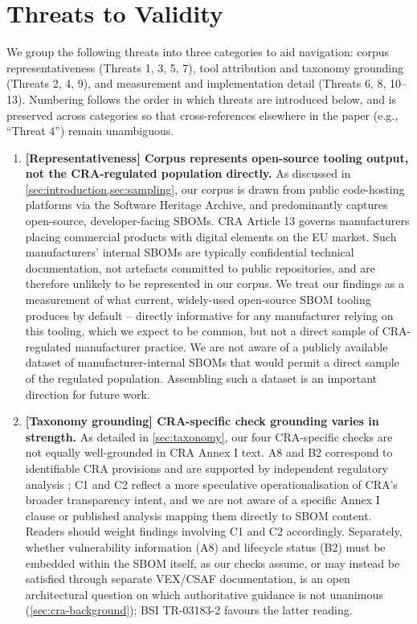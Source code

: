 \documentclass[11pt]{article}
\begin{document}
\section{Threats to Validity}
\label{sec:threats}

We group the following threats into three categories to aid navigation: corpus representativeness (Threats 1, 3, 5, 7), tool attribution and taxonomy grounding (Threats 2, 4, 9), and measurement and implementation detail (Threats 6, 8, 10--13). Numbering follows the order in which threats are introduced below, and is preserved across categories so that cross-references elsewhere in the paper (e.g., ``Threat 4'') remain unambiguous.

\begin{enumerate}[label=\arabic*.,leftmargin=*]
\item \textbf{[Representativeness] Corpus represents open-source tooling output, not the CRA-regulated population directly.} As discussed in \cref{sec:introduction,sec:sampling}, our corpus is drawn from public code-hosting platforms via the Software Heritage Archive, and predominantly captures open-source, developer-facing SBOMs. CRA Article 13 governs manufacturers placing commercial products with digital elements on the EU market. Such manufacturers' internal SBOMs are typically confidential technical documentation, not artefacts committed to public repositories, and are therefore unlikely to be represented in our corpus. We treat our findings as a measurement of what current, widely-used open-source SBOM tooling produces by default -- directly informative for any manufacturer relying on this tooling, which we expect to be common, but not a direct sample of CRA-regulated manufacturer practice. We are not aware of a publicly available dataset of manufacturer-internal SBOMs that would permit a direct sample of the regulated population. Assembling such a dataset is an important direction for future work.

\item \textbf{[Taxonomy grounding] CRA-specific check grounding varies in strength.} As detailed in \cref{sec:taxonomy}, our four CRA-specific checks are not equally well-grounded in CRA Annex I text. A8 and B2 correspond to identifiable CRA provisions and are supported by independent regulatory analysis \cite{ruohonen2025timmers,ruohonen2025gdpr}; C1 and C2 reflect a more speculative operationalisation of CRA's broader transparency intent, and we are not aware of a specific Annex I clause or published analysis mapping them directly to SBOM content. Readers should weight findings involving C1 and C2 accordingly. Separately, whether vulnerability information (A8) and lifecycle status (B2) must be embedded within the SBOM itself, as our checks assume, or may instead be satisfied through separate VEX/CSAF documentation, is an open architectural question on which authoritative guidance is not unanimous (\cref{sec:cra-background}); BSI TR-03183-2 \cite{bsi2025} favours the latter reading.


\end{enumerate}
\end{document}
